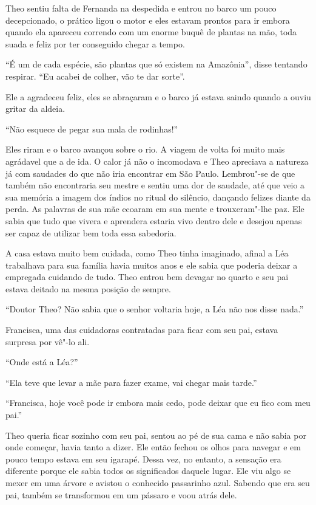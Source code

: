 Theo sentiu falta de Fernanda na despedida e entrou no barco um pouco
decepcionado, o prático ligou o motor e eles estavam prontos para ir
embora quando ela apareceu correndo com um enorme buquê de plantas na
mão, toda suada e feliz por ter conseguido chegar a tempo.

``É um de cada espécie, são plantas que só existem na Amazônia'', disse
tentando respirar. ``Eu acabei de colher, vão te dar sorte''.

Ele a agradeceu feliz, eles se abraçaram e o barco já estava saindo
quando a ouviu gritar da aldeia.

``Não esquece de pegar sua mala de rodinhas!''

Eles riram e o barco avançou sobre o rio. A viagem de volta foi muito
mais agrádavel que a de ida. O calor já não o incomodava e Theo
apreciava a natureza já com saudades do que não iria encontrar em São
Paulo. Lembrou"-se de que também não encontraria seu mestre e sentiu uma
dor de saudade, até que veio a sua memória a imagem dos índios no ritual
do silêncio, dançando felizes diante da perda. As palavras de sua mãe
ecoaram em sua mente e trouxeram"-lhe paz. Ele sabia que tudo que
vivera e aprendera estaria vivo dentro dele e desejou apenas ser capaz
de utilizar bem toda essa sabedoria.

\asterisc



A casa estava muito bem cuidada, como Theo tinha imaginado, afinal a Léa
trabalhava para sua família havia muitos anos e ele sabia que poderia
deixar a empregada cuidando de tudo. Theo entrou bem devagar no quarto e
seu pai estava deitado na mesma posição de sempre.

``Doutor Theo? Não sabia que o senhor voltaria hoje, a Léa não nos disse
nada.''

Francisca, uma das cuidadoras contratadas para ficar com seu pai, estava
surpresa por vê"-lo ali.

``Onde está a Léa?''

``Ela teve que levar a mãe para fazer exame, vai chegar mais tarde.''

``Francisca, hoje você pode ir embora mais cedo, pode deixar que eu fico
com meu pai.''

Theo queria ficar sozinho com seu pai, sentou ao pé de sua cama e não
sabia por onde começar, havia tanto a dizer. Ele então fechou os olhos
para navegar e em pouco tempo estava em seu igarapé. Dessa vez, no
entanto, a sensação era diferente porque ele sabia todos os significados
daquele lugar. Ele viu algo se mexer em uma árvore e avistou o conhecido
passarinho azul. Sabendo que era seu pai, também se transformou em um
pássaro e voou atrás dele.

